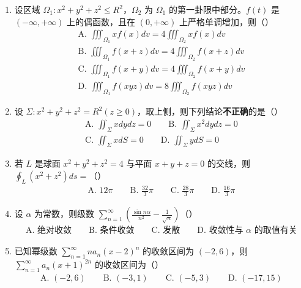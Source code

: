 \documentclass[12pt,a4paper]{article}
\begin{document}
\begin{enumerate}[label=\arabic*、, itemsep=1.5em]
    \item 设区域 \(\Omega_{1}: x^{2} + y^{2} + z^{2} \leq R^{2}\)，\(\Omega_{2}\) 为 \(\Omega_{1}\) 的第一卦限中部分。\(f(t)\) 是 \((-\infty,+\infty)\) 上的偶函数，且在 \((0,+\infty)\) 上严格单调增加，则（\hspace{1cm}）
    \begin{gather*}
        \text{A. } \iiint_{\Omega_1} x f(x) dv = 4\iiint_{\Omega_2} x f(x) dv \\
        \text{B. } \iiint_{\Omega_1} f(x+z) dv = 4\iiint_{\Omega_2} f(x+z) dv \\
        \text{C. } \iiint_{\Omega_1} f(x+y) dv = 4\iiint_{\Omega_2} f(x+y) dv \\
        \text{D. } \iiint_{\Omega_1} f(xyz) dv = 8\iiint_{\Omega_2} f(xyz) dv
    \end{gather*}

    \item 设 \(\Sigma: x^{2} + y^{2} + z^{2} = R^{2}(z \geq 0)\)，取上侧，则下列结论\textbf{不正确}的是（\hspace{1cm}）
    \begin{gather*}
        \text{A. } \iint_{\Sigma} x dy dz = 0 \qquad \text{B. } \iint_{\Sigma} x^{2} dy dz = 0 \\
        \text{C. } \iint_{\Sigma} x dS = 0 \qquad \text{D. } \iint_{\Sigma} y dS = 0
    \end{gather*}

    \item 若 \(L\) 是球面 \(x^{2} + y^{2} + z^{2} = 4\) 与平面 \(x + y + z = 0\) 的交线，则 \(\oint_{L}(x^{2} + z^{2})ds =\)（\hspace{1cm}）
    \begin{gather*}
        \text{A. } 12\pi \qquad \text{B. } \frac{32}{3}\pi \qquad \text{C. } \frac{28}{3}\pi \qquad \text{D. } \frac{16}{3}\pi
    \end{gather*}

    \item 设 \(\alpha\) 为常数，则级数 \(\displaystyle \sum_{n=1}^{\infty}\left(\frac{\sin n\alpha}{n^{2}} - \frac{1}{\sqrt{n}}\right)\)（\hspace{1cm}）
    \begin{gather*}
        \text{A. 绝对收敛} \qquad \text{B. 条件收敛} \qquad \text{C. 发散} \qquad \text{D. 收敛性与 } \alpha \text{ 的取值有关}
    \end{gather*}

    \item 已知幂级数 \(\displaystyle \sum_{n=1}^{\infty}n a_{n}(x-2)^{n}\) 的收敛区间为 \((-2,6)\)，则 \(\displaystyle \sum_{n=1}^{\infty}a_{n}(x+1)^{2n}\) 的收敛区间为（\hspace{1cm}）
    \begin{gather*}
        \text{A. } (-2,6) \qquad \text{B. } (-3,1) \qquad \text{C. } (-5,3) \qquad \text{D. } (-17,15)
    \end{gather*}
\end{enumerate}
\end{document}
